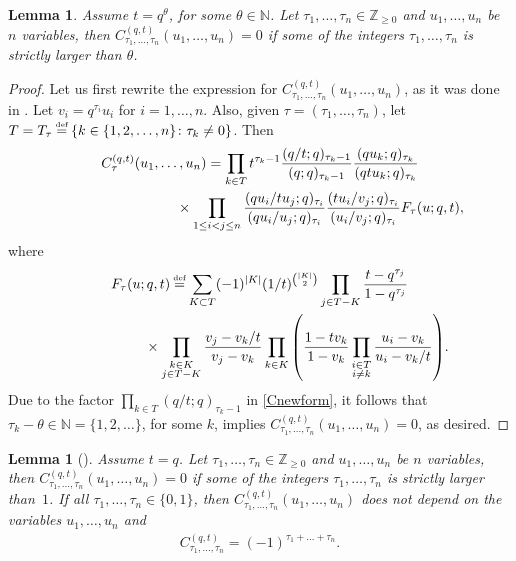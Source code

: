 \documentclass[pdftex]{sigma}
\numberwithin{equation}{section}
\newcommand\myeq{\mathrel{\stackrel{\makebox[0pt]{\mbox{\normalfont\tiny def}}}{=}}}
\newtheorem{lem}[thm]{Lemma}
\newcommand{\Z}{\mathbb{Z}}
\newcommand{\N}{\mathbb{N}}
\begin{document}
\begin{lem}\label{Cprop1}
Assume $t = q^{\theta}$, for some $\theta\in\N$. Let $\tau_1, \dots, \tau_n\in\Z_{\geq 0}$ and $u_1, \dots, u_n$ be $n$ variables, then $C^{(q, t)}_{\tau_1, \dots, \tau_n}(u_1, \dots, u_n) = 0$ if some of the integers $\tau_1, \dots, \tau_n$ is strictly larger than $\theta$.
\end{lem}
\begin{proof}
Let us f\/irst rewrite the expression for $C^{(q, t)}_{\tau_1, \dots, \tau_n}(u_1, \dots, u_n)$, as it was done in \cite[Sec\-tion~6]{LS}. Let $v_i = q^{\tau_i}u_i$ for $i = 1, \dots, n$. Also, given $\tau = (\tau_1, \dots, \tau_n)$, let $T = T_{\tau} \myeq \{k\in\{1, 2, \dots, n\}\colon \tau_k \neq 0\}$. Then
\begin{gather}
C^{(q, t)}_{\tau}(u_1, \dots, u_n) = \prod_{k\in T}{t^{\tau_k-1}\frac{(q/t; q)_{\tau_k-1}}{(q; q)_{\tau_k-1}}\frac{(qu_k; q)_{\tau_k}}{(qtu_k; q)_{\tau_k}}} \nonumber\\
 \hphantom{C^{(q, t)}_{\tau}(u_1, \dots, u_n) =}{}\times \prod_{1\leq i<j\leq n}{\frac{(qu_i/tu_j; q)_{\tau_i}}{(qu_i/u_j; q)_{\tau_i}}\frac{(tu_i/v_j; q)_{\tau_i}}{(u_i/v_j; q)_{\tau_i}}} F_{\tau}(u; q, t),\label{Cnewform}
\end{gather}
where
\begin{gather*}
F_{\tau}(u; q, t) \myeq \sum_{K\subset T} (-1)^{|K|}(1/t)^{{|K| \choose 2}}\prod_{j\in T - K}{\frac{t - q^{\tau_j}}{1 - q^{\tau_j}}}\\
\hphantom{F_{\tau}(u; q, t) \myeq}{}\times \prod_{\substack{k\in K \\ j\in T - K}}{\frac{v_j - v_k/t}{v_j - v_k}}\prod_{k\in K}{\left( \frac{1 - tv_k}{1-v_k}\prod_{\substack{i\in T \\ i\neq k}}{\frac{u_i - v_k}{u_i - v_k/t}} \right)}.
\end{gather*}
Due to the factor $\prod\limits_{k\in T}{(q/t; q)_{\tau_k - 1}}$ in \eqref{Cnewform}, it follows that $\tau_k - \theta\in\N = \{1, 2, \dots\}$, for some $k$, implies $C^{(q, t)}_{\tau_1, \dots, \tau_n}(u_1, \dots, u_n) = 0$, as desired.
\end{proof}

\begin{lem}[{\cite[Lemma 6.1]{LS}}]\label{Cprop2}
Assume $t = q$. Let $\tau_1, \dots, \tau_n\in\Z_{\geq 0}$ and $u_1, \dots, u_n$ be $n$ variables, then $C^{(q, t)}_{\tau_1, \dots, \tau_n}(u_1, \dots, u_n) = 0$ if some of the integers $\tau_1, \dots, \tau_n$ is strictly larger than~$1$. If all $\tau_1, \dots, \tau_n\in\{0, 1\}$, then $C^{(q, t)}_{\tau_1, \dots, \tau_n}(u_1, \dots, u_n)$ does not depend on the variables $u_1, \dots, u_n$ and
\begin{gather*}
C_{\tau_1, \dots, \tau_n}^{(q, t)} = (-1)^{\tau_1 + \dots + \tau_n}.
\end{gather*}
\end{lem}
\end{document}
